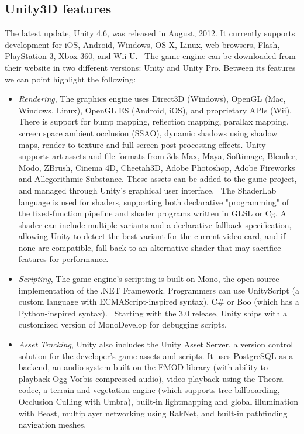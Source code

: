 \subsection{Unity3D features}
\label{subsec:unityfeatures}
The latest update, Unity 4.6, was released in August, 2012. It currently supports development for iOS, Android, Windows, OS X, Linux, web browsers, Flash, PlayStation 3, Xbox 360, and Wii U.~\cite{unitypress2} The game engine can be downloaded from their website in two different versions: Unity and Unity Pro. Between its features we can point highlight the following:
\begin{itemize}
\item \textit{Rendering}, The graphics engine uses Direct3D (Windows), OpenGL (Mac, Windows,
Linux), OpenGL ES (Android, iOS), and proprietary APIs (Wii). There is support for bump mapping, reflection mapping, parallax mapping, screen space ambient occlusion (SSAO), dynamic shadows using shadow maps, render-to-texture and full-screen post-processing effects.
Unity supports art assets and file formats from 3ds Max, Maya, Softimage, Blender, Modo, ZBrush, Cinema 4D, Cheetah3D, Adobe Photoshop, Adobe Fireworks and Allegorithmic Substance. These assets can be added to the game project, and managed through Unity's graphical user interface.~\cite{unitypress3}
The ShaderLab language is used for shaders, supporting both declarative "programming" of the fixed-function pipeline and shader programs written in GLSL or Cg. A shader can include multiple variants and a declarative fallback specification, allowing Unity to detect the best variant for the current video card, and if none are compatible, fall back to an alternative shader that may sacrifice features for performance.~\cite{unitypress4}
\item \textit{Scripting}, The game engine's scripting is built on Mono, the open-source implementation
of the .NET Framework. Programmers can use UnityScript (a custom language with ECMAScript-inspired syntax), C\# or Boo (which has a Python-inspired syntax).~\cite{unitypress5} Starting with the 3.0 release, Unity ships with a customized version of MonoDevelop for debugging scripts.~\cite{unitypress6}
\item \textit{Asset Tracking}, Unity also includes the Unity Asset Server, a version control solution for the developer's game assets and scripts. It uses PostgreSQL as a backend, an audio system built on the FMOD library (with ability to playback Ogg Vorbis compressed audio), video playback using the Theora codec, a terrain and vegetation engine (which supports tree billboarding, Occlusion Culling with Umbra), built-in lightmapping and global illumination with Beast, multiplayer networking using RakNet, and built-in pathfinding navigation meshes.~\cite{unitypress7}

\end{itemize}

